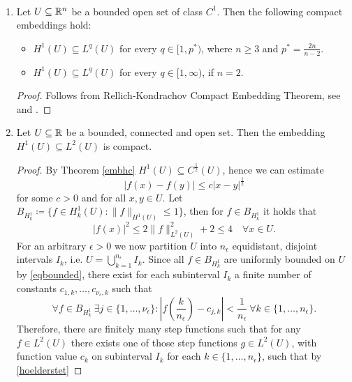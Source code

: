\begin{atheorem} \label{compact-embedding-theorem} ~\
	\begin{enumerate}[label=\alph*\upshape)]
		\item Let $U \subseteq \mathbb{R}^{n}$ be a bounded open set of class $C^{1}$. Then the following compact embeddings hold:
			\begin{itemize}
				\item $H	^{1}(U) \subseteq L^{q}(U)$ for every $q \in [1, p^{*})$, where $n \geq 3$ and $p^{*} = \frac{2n}{n - 2}$.
				\item $H^{1}(U) \subseteq L^{q}(U)$ for every $q \in [1, \infty)$, if $n = 2$.
			\end{itemize}
		
			\begin{proof}
				Follows from Rellich-Kondrachov Compact Embedding Theorem, see \cite[p. 163]{precup2013linear} and \cite[p. 272]{evans1998partial}.
			\end{proof}
		\item Let $U \subseteq \mathbb{R}$ be a bounded, connected and open set. Then the embedding $H^{1}(U) \subseteq L^{2}(U)$ is compact.
			\begin{proof} 
				By Theorem \ref{embhc} $H^{1}(U) \subseteq C^{\frac{1}{2}}(U)$, hence we can estimate
					\begin{equation}
						|f(x) - f(y)| \leq c |x - y|^{\frac{1}{2}} \tag{$*$} \label{hoelderstet}
					\end{equation} 
				for some $c > 0$ and for all $x, y \in U$. Let $B_{H^{1}_{k}} \coloneqq \{ f \in H^{1}_{k}(U) : \|f\|_{H^{1}(U)} \leq 1 \}$, then for $f \in B_{H^{1}_{k}}$ it holds that
				\begin{equation}
					|f(x)|^{2} \leq 2 \| f\|^{2}_{L^{2}(U)} + 2 \leq 4 \quad \forall x \in U. \tag{$**$} \label{eqbounded}
				\end{equation} 
				For an arbitrary $\epsilon > 0$ we now partition $U$ into $n_{\epsilon}$ equidistant, disjoint intervals $I_{k}$, i.e. $U = \bigcup_{k = 1}^{n_{\epsilon}} I_{k}$. Since all $f \in B_{H^{1}_{k}}$ are uniformly bounded on $U$ by \eqref{eqbounded}, there exist for each subinterval $I_{k}$ a finite number of constants $c_{1, k}, \dotsc, c_{\nu_{\epsilon}, k}$ such that
					\[ \forall f \in B_{H^{1}_{k}} ~\exists j \in \{1, \dotsc, \nu_{\epsilon} \} : \left| f\left(\frac{k}{n_{\epsilon}}\right) - c_{j, k} \right| < \frac{1}{n_{\epsilon}} ~\forall k \in \{ 1, \dotsc, n_{\epsilon} \}. \]
				Therefore, there are finitely many step functions such that for any $f \in L^{2}(U)$ there exists one of those step functions $g \in L^{2}(U)$, with function value $c_{k}$ on subinterval $I_{k}$ for each $k \in \{1, \dotsc, n_{\epsilon}\}$, such that by \eqref{hoelderstet}

\end{proof}
\end{enumerate}
\end{atheorem}
